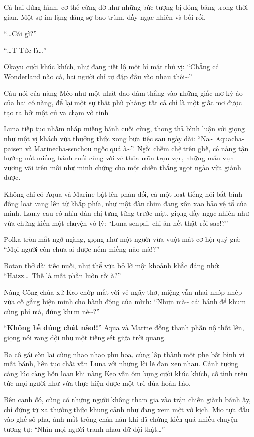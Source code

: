 \documentclass[../main.tex]{subfiles}
\begin{document}
Cả hai đứng hình, cơ thể cứng đờ như những bức tượng bị đóng băng trong thời gian. Một sự im lặng đáng sợ bao trùm, đầy ngạc nhiên và bối rối.

``\dots Cái gì?''

``\dots T-Tức là\dots''

Okayu cười khúc khích, như đang tiết lộ một bí mật thú vị: ``Chẳng có Wonderland nào cả, hai người chỉ tự đập đầu vào nhau thôi\~{}''

Câu nói của nàng Mèo như một nhát dao đâm thẳng vào những giấc mơ kỳ ảo của hai cô nàng, để lại một sự thật phũ phàng: tất cả chỉ là một giấc mơ được tạo ra bởi một cú va chạm vô tình.

Luna tiếp tục nhấm nháp miếng bánh cuối cùng, thong thả bình luận với giọng như một vị khách vừa thưởng thức xong bữa tiệc sau ngày dài: ``Na\~{} Aquacha-paisen và Marinecha-senchou ngốc quá à\~{}''. Ngồi chễm chệ trên ghế, cô nàng tận hưởng nốt miếng bánh cuối cùng với vẻ thỏa mãn trọn vẹn, những mẩu vụn vương vãi trên môi như minh chứng cho một chiến thắng ngọt ngào vừa giành được.

Không chỉ có Aqua và Marine bật lên phản đối, cả một loạt tiếng nói bất bình đồng loạt vang lên từ khắp phía, như một đàn chim đang xôn xao bảo vệ tổ của mình. Lamy cau có nhìn đàn chị tưng tửng trước mặt, giọng đầy ngạc nhiên như vừa chứng kiến một chuyện vô lý: ``Luna-senpai, chị ăn hết thật rồi sao!?''

Polka tròn mắt ngỡ ngàng, giọng như một người vừa vuột mất cơ hội quý giá: ``Mọi người còn chưa ai được nếm miếng nào mà!?''

Botan thở dài tiếc nuối, như thể vừa bỏ lỡ một khoảnh khắc đáng nhớ: ``Haizz\dots\ Thế là mất phần luôn rồi à?''

Nàng Công chúa xứ Kẹo chớp mắt với vẻ ngây thơ, miệng vẫn nhai nhóp nhép vừa cố gắng biện minh cho hành động của mình: ``Nhưn mà\~{} cái bánh để khum cũng phí mà, đúng khum nè\~{}?''

``\textbf{Không hề đúng chút nào!!}'' Aqua và Marine đồng thanh phẫn nộ thốt lên, giọng nói vang dội như một tiếng sét giữa trời quang.

Ba cô gái còn lại cũng nhao nhao phụ họa, cùng lập thành một phe bất bình vì mất bánh, liên tục chất vấn Luna với những lời lẽ đan xen nhau. Cảnh tượng càng lúc càng hỗn loạn khi nàng Kẹo vẫn ôm bụng cười khúc khích, cố tình trêu tức mọi người như vừa thực hiện được một trò đùa hoàn hảo.

Bên cạnh đó, cũng có những người không tham gia vào trận chiến giành bánh ấy, chỉ đứng từ xa thưởng thức khung cảnh như đang xem một vở kịch. Mio tựa đầu vào ghế sô-pha, ánh mắt trông chán nản khi đã chứng kiến quá nhiều chuyện tương tự: ``Nhìn mọi người tranh nhau dữ dội thật\dots''
\end{document}
